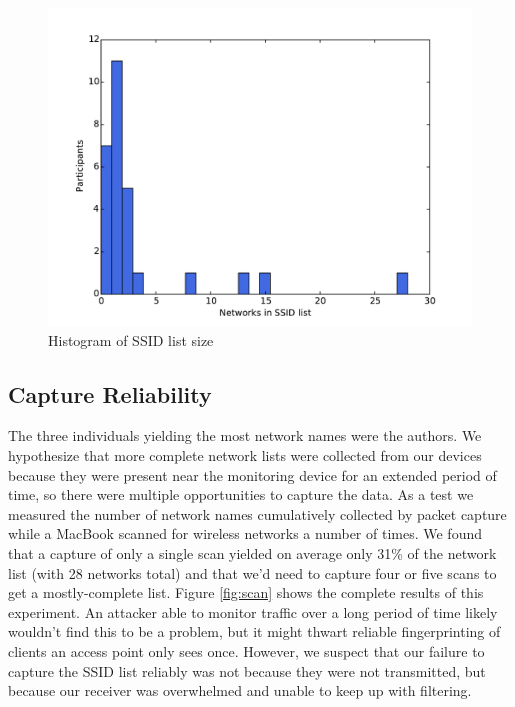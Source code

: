 \documentclass[letterpaper,twocolumn,10pt]{article}
\begin{document}
\begin{figure}
\includegraphics[width=\columnwidth]{hist.pdf}
\caption{Histogram of SSID list size}
\label{histogram}
\end{figure}

\FloatBarrier

\subsection{Capture Reliability}
The three individuals yielding the most network names were the authors. We hypothesize that more complete network lists were collected from our devices because they were present near the monitoring device for an extended period of time, so there were multiple opportunities to capture the data. As a test we measured the number of network names cumulatively collected by packet capture while a MacBook scanned for wireless networks a number of times. We found that a capture of only a single scan yielded on average only 31\% of the network list (with 28 networks total) and that we'd need to capture four or five scans to get a mostly-complete list. Figure \ref{fig:scan} shows the complete results of this experiment. An attacker able to monitor traffic over a long period of time likely wouldn't find this to be a problem, but it might thwart reliable fingerprinting of clients an access point only sees once. However, we suspect that our failure to capture the SSID list reliably was not because they were not transmitted, but because our receiver was overwhelmed and unable to keep up with filtering.
\end{document}
